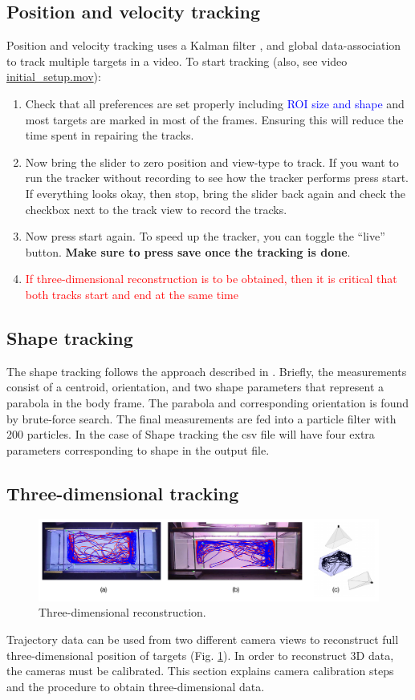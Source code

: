 \documentclass[11pt]{article}
\begin{document}
\subsection{Position and velocity tracking}
Position and velocity tracking uses a Kalman filter \cite{BarShalom1987}, and global data-association \cite{Kuhn1955} to track multiple targets in a video. To start tracking (also, see video \href{run:initial\_setup.mov}{initial\_setup.mov}):
\begin{enumerate}
\item Check that all preferences are set properly including \textcolor{blue}{ROI size and shape} and most targets are marked in most of the frames. Ensuring this will reduce the time spent in repairing the tracks. 
\item Now bring the slider to zero position and view-type to track. If you want to run the tracker without recording to see how the tracker performs press start. If everything looks okay, then stop, bring the slider back again and check the checkbox next to the track view to record the tracks. 
\item Now press start again. To speed up the tracker, you can toggle the ``live'' button. \textbf{Make sure to press save once the tracking is done}.
\item \textcolor{red}{If three-dimensional reconstruction is to be obtained, then it is critical that both tracks start and end at the same time}
\end{enumerate}

\subsection{Shape tracking}
The shape tracking follows the approach described in \cite{Bartolini2015}. Briefly, the measurements consist of a centroid, orientation, and two shape parameters that represent a parabola in the body frame. The parabola and corresponding orientation is found by brute-force search. The final measurements are fed into a particle filter with 200 particles. 
In the case of Shape tracking the csv file will have four extra parameters corresponding to shape in the output file. 


\subsection{Three-dimensional tracking}
\begin{figure}[ht]
\centering
\includegraphics[width=.995\linewidth]{threed_new}
\caption{Three-dimensional reconstruction.}
\label{fig:threed_new}
\end{figure}
Trajectory data can be used from two different camera views to reconstruct full three-dimensional position of targets (Fig. \ref{fig:threed_new}). In order to reconstruct 3D data, the cameras must be calibrated.  This section explains camera calibration steps and the procedure to obtain three-dimensional data.
\end{document}
